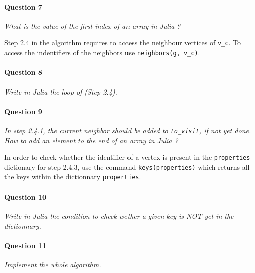 \documentclass{article}
\begin{document}
\paragraph{Question 7} \textit{What is the value of the first index of an array in Julia ?}

\medskip
\noindent
Step 2.4 in the algorithm requires to access the neighbour vertices of \texttt{v\_c}. To access the indentifiers of the neighbors use \texttt{neighbors(g, v\_c)}.

\paragraph{Question 8} \textit{Write in Julia the loop of (Step 2.4).}

\paragraph{Question 9} \textit{In step 2.4.1, the current neighbor should be added to \texttt{to\_visit}, if not yet done. How to add an element to the end of an array in Julia ?}

\medskip
\noindent
In order to check whether the identifier of a vertex is present in the \texttt{properties} dictionary for step 2.4.3, use the command \texttt{keys(properties)} which returns all the keys within the dictionnary \texttt{properties}.

\paragraph{Question 10} \textit{Write in Julia the condition to check wether a given key is NOT yet in the dictionnary.}

\paragraph{Question 11} \textit{Implement the whole algorithm.}
\end{document}

